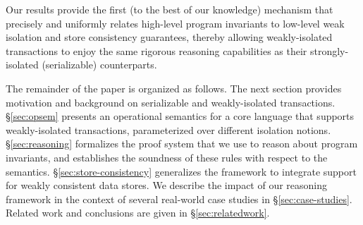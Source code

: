 \noindent Our results provide the first (to the best of our knowledge)
mechanism that precisely and uniformly relates high-level program
invariants to low-level weak isolation and store consistency
guarantees, thereby allowing weakly-isolated transactions to enjoy the
same rigorous reasoning capabilities as their strongly-isolated
(serializable) counterparts.

The remainder of the paper is organized as follows.  The next section
provides motivation and background on serializable and weakly-isolated
transactions. \S\ref{sec:opsem} presents an operational semantics for
a core language that supports weakly-isolated transactions,
parameterized over different isolation notions. \S\ref{sec:reasoning}
formalizes the proof system that we use to reason about program
invariants, and establishes the soundness of these rules with respect
to the semantics. \S\ref{sec:store-consistency} generalizes the
framework to integrate support for weakly consistent data stores. We
describe the impact of our reasoning framework in the context of
several real-world case studies in \S\ref{sec:case-studies}.  Related
work and conclusions are given in \S\ref{sec:relatedwork}.
